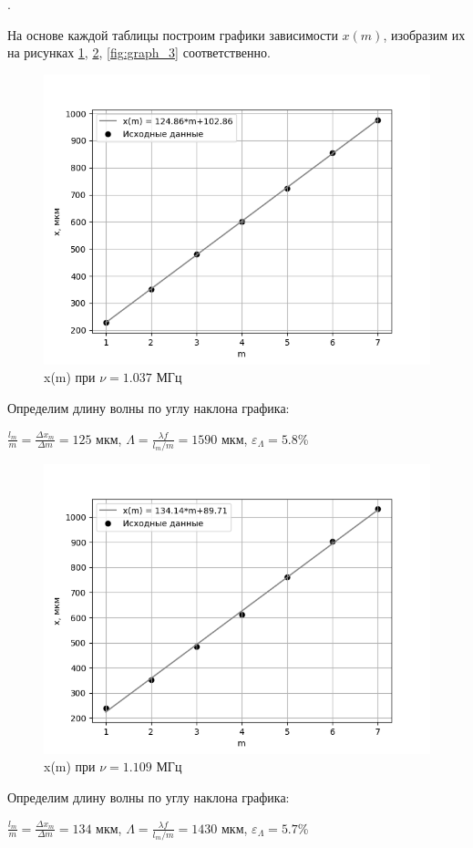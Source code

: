 \documentclass[a4paper, 12pt]{article}
\newcounter{Points}
\newcommand{\point}{\arabic{Points}. \addtocounter{Points}{1}}
\begin{document}
\point На основе каждой таблицы построим графики зависимости $x(m)$, изобразим их на рисунках \ref{fig:graph_1}, \ref{fig:graph_2}, \ref{fig:graph_3} соответственно.

\begin{figure}[H]
    \centering
    \includegraphics[width=0.6\linewidth]{graph1.png}
    \caption{x(m) при $\nu = 1.037$ МГц}
    \label{fig:graph_1}
\end{figure}

Определим длину волны по углу наклона графика:
\begin{center}
    $\frac{l_m}{m} = \frac{\Delta x_m}{\Delta m} = 125$ мкм,
    $\Lambda = \frac{\lambda f}{l_m/m} = 1590$ мкм,
    $\varepsilon_{\Lambda} = 5.8$\%
\end{center}

\begin{figure}[H]
    \centering
    \includegraphics[width=0.6\linewidth]{graph2.png}
    \caption{x(m) при $\nu = 1.109$ МГц}
    \label{fig:graph_2}
\end{figure}

Определим длину волны по углу наклона графика:
\begin{center}
    $\frac{l_m}{m} = \frac{\Delta x_m}{\Delta m} = 134$ мкм,
    $\Lambda = \frac{\lambda f}{l_m/m} = 1430$ мкм,
    $\varepsilon_{\Lambda} = 5.7$\%
\end{center}
\end{document}
